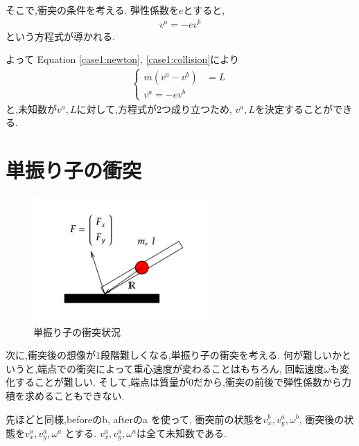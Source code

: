 \documentclass[a4paper,11pt]{jsarticle}
\begin{document}
そこで,衝突の条件を考える.
弾性係数を$e$とすると,
\begin{gather}
  v^a = -e v^b
  \label{case1:collision}
\end{gather}
という方程式が導かれる.

よって Equation \ref{case1:newton}, \ref{case1:collision}により
\begin{align*}
  \begin{cases}
    m(v^a - v^b) &= L
    \\
    v^a = -e v^b
  \end{cases}
\end{align*}
と,未知数が$v^a, L$に対して,方程式が2つ成り立つため,
$v^a, L$を決定することができる.

\section{単振り子の衝突}

\begin{figure}[h]
  \centering
  \includegraphics[width = 0.6\textwidth]{1seg_collision.png}
  \caption{単振り子の衝突状況}
  \label{1seg_collision.png}
\end{figure}

次に,衝突後の想像が1段階難しくなる,単振り子の衝突を考える.
何が難しいかというと,端点での衝突によって重心速度が変わることはもちろん,
回転速度$\omega$も変化することが難しい.
そして,端点は質量が0だから,衝突の前後で弾性係数から力積を求めることもできない.

先ほどと同様,beforeのb, afterのa を使って,
衝突前の状態を$v_x^b, v_y^a, \omega^b$,
衝突後の状態を$v_x^a, v_y^a, \omega^a$
とする.
$v_x^a, v_y^a, \omega^a$は全て未知数である.
\end{document}
